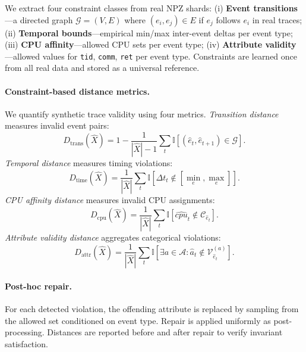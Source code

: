 We extract four constraint classes from real NPZ shards: (i) \textbf{Event transitions}—a directed graph $\mathcal{G} = (V, E)$ where $(e_i, e_j) \in E$ if $e_j$ follows $e_i$ in real traces; (ii) \textbf{Temporal bounds}—empirical min/max inter-event deltas per event type; (iii) \textbf{CPU affinity}—allowed CPU sets per event type; (iv) \textbf{Attribute validity}—allowed values for \texttt{tid}, \texttt{comm}, \texttt{ret} per event type. Constraints are learned once from all real data and stored as a universal reference.

\paragraph{Constraint-based distance metrics.}
We quantify synthetic trace validity using four metrics. \emph{Transition distance} measures invalid event pairs:
\[
D_{\text{trans}}(\hat{X}) = 1 - \frac{1}{|\hat{X}|-1} \sum_{t} \mathbb{I}\left[(\hat{e}_t, \hat{e}_{t+1}) \in \mathcal{G}\right].
\]
\emph{Temporal distance} measures timing violations:
\[
D_{\text{time}}(\hat{X}) = \frac{1}{|\hat{X}|} \sum_{t} \mathbb{I}\left[\Delta t_t \notin [\min_e, \max_e]\right].
\]
\emph{CPU affinity distance} measures invalid CPU assignments:
\[
D_{\text{cpu}}(\hat{X}) = \frac{1}{|\hat{X}|} \sum_{t} \mathbb{I}\left[\hat{cpu}_t \notin \mathcal{C}_{\hat{e}_t}\right].
\]
\emph{Attribute validity distance} aggregates categorical violations:
\[
D_{\text{attr}}(\hat{X}) = \frac{1}{|\hat{X}|} \sum_{t} \mathbb{I}\left[\exists a \in \mathcal{A} : \hat{a}_t \notin \mathcal{V}_{\hat{e}_t}^{(a)}\right].
\]

\paragraph{Post-hoc repair.}
For each detected violation, the offending attribute is replaced by sampling from the allowed set conditioned on event type. Repair is applied uniformly as post-processing. Distances are reported before and after repair to verify invariant satisfaction.